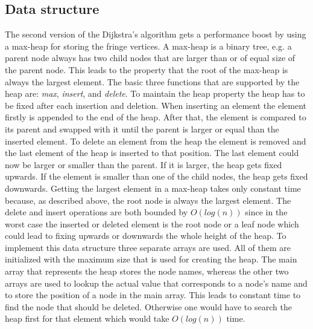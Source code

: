 \documentclass{article}
\begin{document}
\subsection{Data structure}
The second version of the Dijkstra's algorithm gets a performance boost by using a max-heap for storing the fringe vertices. A max-heap is a binary tree, e.g. a parent node always has two child nodes that are larger than or of equal size of the parent node. This leads to the property that the root of the max-heap is always the largest element. The basic three functions that are supported by the heap are: \textit{max}, \textit{insert}, and \textit{delete}. To maintain the heap property the heap has to be fixed after each insertion and deletion. When inserting an element the element firstly is appended to the end of the heap. After that, the element is compared to its parent and swapped with it until the parent is larger or equal than the inserted element. To delete an element from the heap the element is removed and the last element of the heap is inserted to that position. The last element could now be larger or smaller than the parent. If it is larger, the heap gets fixed upwards. If the element is smaller than one of the child nodes, the heap gets fixed downwards. 
Getting the largest element in a max-heap takes only constant time because, as described above, the root node is always the largest element. The delete and insert operations are both bounded by $O(log(n))$ since in the worst case the inserted or deleted element is the root node or a leaf node which could lead to fixing upwards or downwards the whole height of the heap.
To implement this data structure three separate arrays are used. All of them are initialized with the maximum size that is used for creating the heap. The main array that represents the heap stores the node names, whereas the other two arrays are used to lookup the actual value that corresponds to a node's name and to store the position of a node in the main array. This leads to constant time to find the node that should be deleted. Otherwise one would have to search the heap first for that element which would take $O(log(n))$ time.
\end{document}

